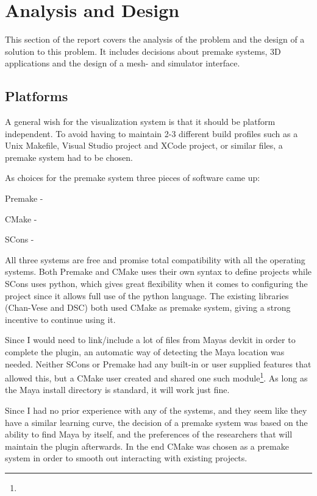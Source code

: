 \section{Analysis and Design}
This section of the report covers the analysis of the problem and the design of
a solution to this problem. It includes decisions about premake systems, 3D
applications and the design of a mesh- and simulator interface.

\subsection{Platforms}
\label{sec:platforms}

A general wish for the visualization system is that it should be platform
independent. To avoid having to maintain 2-3 different build profiles such as
a Unix Makefile, Visual Studio project and XCode project, or similar files, a
premake system had to be chosen.

As choices for the premake system three pieces of software came up:
\begin{enumerate*}
  \item Premake - 
  \item CMake - 
  \item SCons - 
\end{enumerate*}

All three systems are free and promise total compatibility with all the operating
systems. Both Premake and CMake uses their own syntax to define projects while
SCons uses python, which gives great flexibility when it comes to configuring
the project since it allows full use of the python language. The existing
libraries (Chan-Vese and DSC) both used CMake as premake system, giving a strong
incentive to continue using it.

Since I would need to link/include a lot of files from Mayas devkit in order to
complete the plugin, an automatic way of detecting the Maya location was needed.
Neither SCons or Premake had any built-in or user supplied features that allowed
this, but a CMake user created and shared one such module\footnote{}. As long as the Maya install directory
is standard, it will work just fine.

Since I had no prior experience with any of the systems, and they seem like they
have a similar learning curve, the decision of a premake system was based on
the ability to find Maya by itself, and the preferences of the researchers that
will maintain the plugin afterwards. In the end CMake was chosen as a premake
system in order to smooth out interacting with existing projects.

